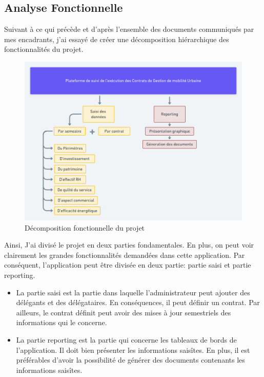 \documentclass[a4paper]{report}
\begin{document}
\begin{doublespace}
	\section{Analyse Fonctionnelle}
	Suivant à ce qui précède et d’après l’ensemble des documents communiqués par mes encadrants, j’ai essayé de créer une décomposition hiérarchique des fonctionnalités du projet.
	\begin{figure}[H]
		\begin{center}
			\includegraphics[scale=0.5]{images/WBS KPI.png}
			\caption{Décomposition fonctionnelle du projet}
		\end{center}
	\end{figure}
	Ainsi, J'ai divisé le projet en deux parties fondamentales. En plus, on peut voir clairement les grandes fonctionnalités demandées dans cette application. Par conséquent, l'application peut être divisée en deux partie: partie saisi et partie reporting.
	\begin{itemize}
		\item La partie saisi est la partie dans laquelle l'administrateur peut ajouter des délégants et des délégataires. En conséquences, il peut définir un contrat. Par ailleurs, le contrat définit peut avoir des mises à jour semestriels des informations qui le concerne.
		\item La partie reporting est la partie qui concerne les tableaux de bords de l’application. Il doit bien présenter les informations saisîtes. En plus, il est préférables d'avoir la possibilité de générer des documents contenants les informations saisîtes.
	\end{itemize}

\end{doublespace}
\end{document}
